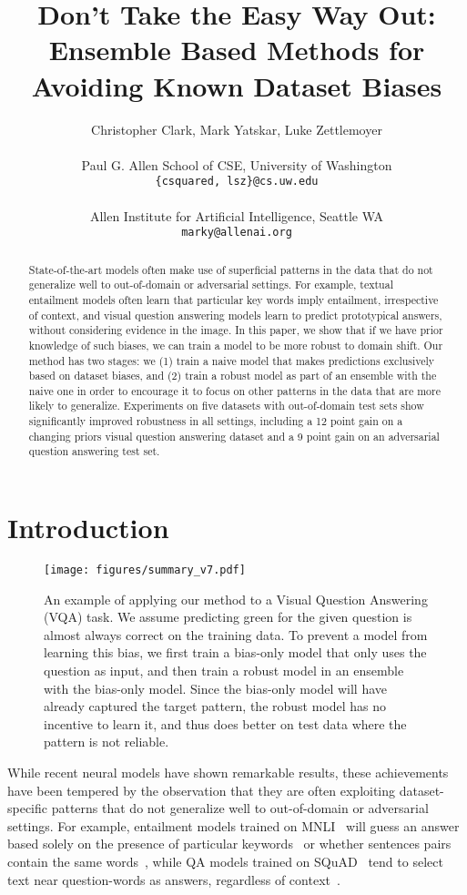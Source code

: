 \documentclass[11pt,a4paper]{article}
\title{Don't Take the Easy Way Out:\\ Ensemble Based Methods for Avoiding Known Dataset Biases}
\author{Christopher Clark, Mark Yatskar, Luke Zettlemoyer \\ \\
Paul G. Allen School of CSE, University of Washington \\
{\tt \{csquared, lsz\}@cs.uw.edu} \\ \\
Allen Institute for Artificial Intelligence, Seattle WA \\
{\tt marky@allenai.org} \\
}
\date{}
\begin{document}
\maketitle

\newcommand{\tablefont}{\small}

\begin{abstract}
State-of-the-art models often make use of superficial patterns in the data that do not generalize well to out-of-domain or adversarial settings.
For example, textual entailment models often learn that particular key words imply entailment, irrespective of context, and visual question answering models learn to predict prototypical answers, without considering evidence in the image.
In this paper, we show that if we have prior knowledge of such biases, we can train a model to be more robust to domain shift.
Our method has two stages: we (1) train a naive model that makes predictions exclusively based on dataset biases, and (2) train a robust model as part of an ensemble with the naive one in order to encourage it to focus on other patterns in the data that are more likely to generalize.
Experiments on five datasets with out-of-domain test sets show significantly improved robustness in all settings, including a 12 point gain on a changing priors visual question answering dataset and a 9 point gain on an adversarial question answering test set.
\end{abstract}



%
 
\section{Introduction}
\begin{figure*}
    \centering
    \texttt{[image: figures/summary\_v7.pdf]}
    \caption{An example of applying our method to a Visual Question Answering (VQA) task. We assume predicting green for the given question is almost always correct on the training data. 
    To prevent a model from learning this bias, we first train a bias-only model that only uses the question as input, and then train a robust model in an ensemble with the bias-only model.
    Since the bias-only model will have already captured the target pattern, the robust model has no incentive to learn it, and thus does better on test data where the pattern is not reliable.}
    \label{fig:summary}
\end{figure*}

While recent neural models have shown remarkable results, these achievements have been tempered by the observation that they are often exploiting dataset-specific patterns that do not generalize well to out-of-domain or adversarial settings.
For example, entailment models trained on MNLI~\cite{bowman2015large} will guess an answer based solely on the presence of particular keywords~\cite{gururangan2018annotation} or whether sentences pairs contain the same words~\cite{mccoy2019right}, while QA models trained on SQuAD~\cite{squad} tend to select text near question-words as answers, regardless of context~\cite{adversarial_squad}.
\end{document}
